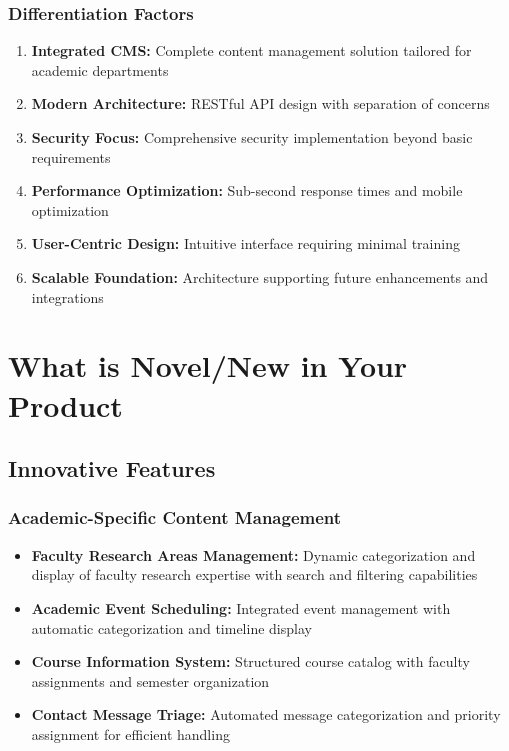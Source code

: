 \documentclass[12pt,a4paper]{report}
\begin{document}
\subsection{Differentiation Factors}
\begin{enumerate}
    \item \textbf{Integrated CMS:} Complete content management solution tailored for academic departments
    \item \textbf{Modern Architecture:} RESTful API design with separation of concerns
    \item \textbf{Security Focus:} Comprehensive security implementation beyond basic requirements
    \item \textbf{Performance Optimization:} Sub-second response times and mobile optimization
    \item \textbf{User-Centric Design:} Intuitive interface requiring minimal training
    \item \textbf{Scalable Foundation:} Architecture supporting future enhancements and integrations
\end{enumerate}

\chapter{What is Novel/New in Your Product}
\label{chap:novelty}

\section{Innovative Features}

\subsection{Academic-Specific Content Management}
\begin{itemize}
    \item \textbf{Faculty Research Areas Management:} Dynamic categorization and display of faculty research expertise with search and filtering capabilities
    \item \textbf{Academic Event Scheduling:} Integrated event management with automatic categorization and timeline display
    \item \textbf{Course Information System:} Structured course catalog with faculty assignments and semester organization
    \item \textbf{Contact Message Triage:} Automated message categorization and priority assignment for efficient handling
\end{itemize}
\end{document}
